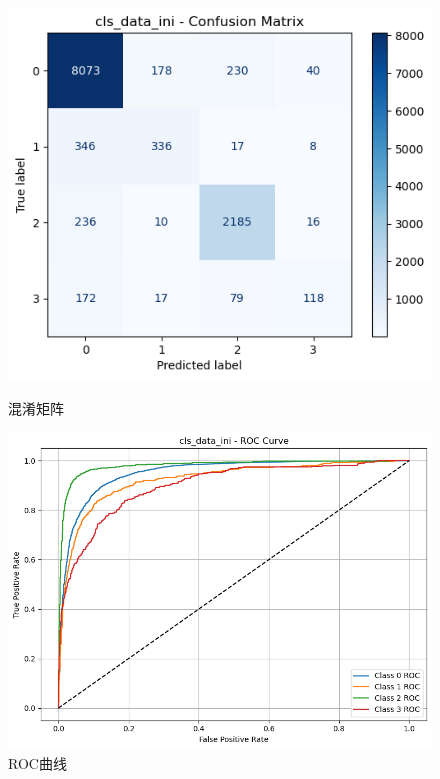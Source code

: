 \documentclass[10pt]{article}
\begin{document}
\begin{figure}[H]
\centering
\begin{minipage}[t]{0.45\textwidth}
  \centering
  \includegraphics[width=\linewidth]{cls_log_ini1.png}
  \caption{混淆矩阵}
  \label{fig:32}
\end{minipage}
\hfill
\begin{minipage}[t]{0.52\textwidth}
  \centering
  \includegraphics[width=\linewidth]{cls_log_ini2.png}
  \caption{ROC曲线}
  \label{fig:13}
\end{minipage}
\end{figure}
\end{document}
